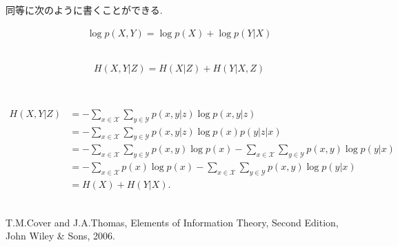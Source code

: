 \documentclass[a4j]{jsarticle}
\begin{document}
同等に次のように書くことができる.

\begin{align}
	\log p(X, Y) =\log p(X) + \log p(Y | X)
\end{align}\\

\begin{itembox}[l]{}
	\begin{equation}
		H(X, Y|Z) = H(X|Z) + H(Y|X, Z)
	\end{equation}
\end{itembox}\\


\begin{align}
	H(X, Y|Z) & = - \sum_{x \in \mathcal{X}} \sum_{y \in \mathcal{Y}} p(x, y|z) \log p(x, y|z)                                                                    \\
	          & = - \sum_{x \in \mathcal{X}} \sum_{y \in \mathcal{Y}} p(x, y|z) \log p(x) p(y|z|x)                                                                \\
	          & = - \sum_{x \in \mathcal{X}} \sum_{y \in \mathcal{Y}} p(x, y) \log p(x) - \sum_{x \in \mathcal{X}} \sum_{y \in \mathcal{Y}} p(x, y) \log p(y | x) \\
	          & = - \sum_{x \in \mathcal{X}} p(x) \log p(x)- \sum_{x \in \mathcal{X}} \sum_{y \in \mathcal{Y}} p(x, y) \log p(y | x)                              \\
	          & = H(X) + H(Y|X).
\end{align}\\

\begin{thebibliography}{99}
	T.M.Cover and J.A.Thomas, Elements of Information Theory, Second Edition, John Wiley \& Sons, 2006.
\end{thebibliography}
\end{document}
